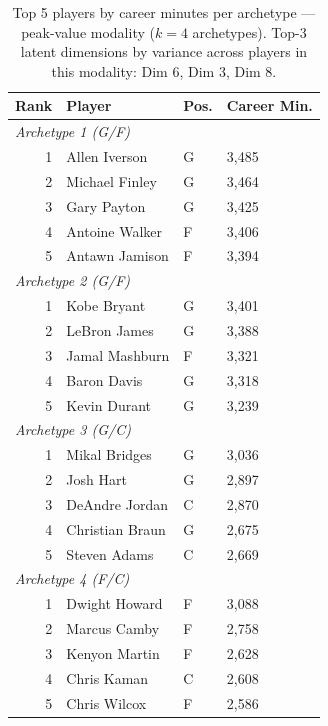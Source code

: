 \begin{table}[htbp]
  \centering\small
  \begin{tabular}{rlll}
    \toprule
    Rank & Player & Pos. & Career Min. \\
    \midrule
    \multicolumn{4}{l}{\textit{Archetype 1 (G/F)}} \\
    \midrule
    1 & Allen Iverson & G & 3,485 \\
    2 & Michael Finley & G & 3,464 \\
    3 & Gary Payton & G & 3,425 \\
    4 & Antoine Walker & F & 3,406 \\
    5 & Antawn Jamison & F & 3,394 \\
    \midrule[0.4pt]
    \multicolumn{4}{l}{\textit{Archetype 2 (G/F)}} \\
    \midrule
    1 & Kobe Bryant & G & 3,401 \\
    2 & LeBron James & G & 3,388 \\
    3 & Jamal Mashburn & F & 3,321 \\
    4 & Baron Davis & G & 3,318 \\
    5 & Kevin Durant & G & 3,239 \\
    \midrule[0.4pt]
    \multicolumn{4}{l}{\textit{Archetype 3 (G/C)}} \\
    \midrule
    1 & Mikal Bridges & G & 3,036 \\
    2 & Josh Hart & G & 2,897 \\
    3 & DeAndre Jordan & C & 2,870 \\
    4 & Christian Braun & G & 2,675 \\
    5 & Steven Adams & C & 2,669 \\
    \midrule[0.4pt]
    \multicolumn{4}{l}{\textit{Archetype 4 (F/C)}} \\
    \midrule
    1 & Dwight Howard & F & 3,088 \\
    2 & Marcus Camby & F & 2,758 \\
    3 & Kenyon Martin & F & 2,628 \\
    4 & Chris Kaman & C & 2,608 \\
    5 & Chris Wilcox & F & 2,586 \\
    \bottomrule
  \end{tabular}
  \caption{Top 5 players by career minutes per archetype --- peak-value modality ($k=4$ archetypes). Top-3 latent dimensions by variance across players in this modality: Dim 6, Dim 3, Dim 8.}
  \label{tab:arch_reps_peak_value}
\end{table}

